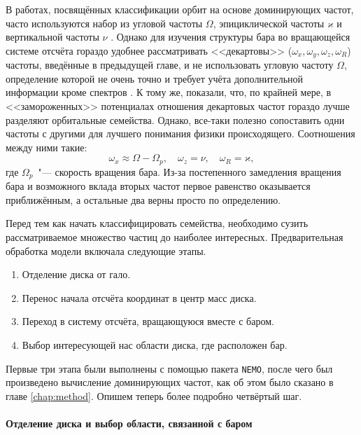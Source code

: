 \documentclass[tikz]{trlnotes}
\begin{document}
В работах, посвящённых классификации орбит на основе доминирующих частот, часто используются набор из угловой
частоты $Ω$, эпициклической частоты $ϰ$ и вертикальной частоты $ν$
\citep{athanassoula2002a,ceverino2007,voglis2007}. Однако для изучения структуры бара во вращающейся системе
отсчёта гораздо удобнее рассматривать <<декартовы>> ($ω_x, ω_y, ω_z, ω_R$) частоты, введённые в предыдущей главе, и не использовать угловую частоту $Ω$, определение которой не очень точно и требует учёта дополнительной информации кроме спектров
\citep{athanassoula2002,gajda2016}. К тому же, \citet{valluri2016} показали, что, по крайней мере, в <<замороженных>> потенциалах отношения декартовых частот
гораздо лучше разделяют орбитальные семейства. 
Однако, все-таки полезно сопоставить одни частоты с другими для лучшего понимания физики происходящего. Соотношения между ними такие: 
\[
  ω_x \approx Ω - Ω_p, \quad ω_z = ν, \quad ω_R = ϰ,
\]
где $Ω_p$~"--- скорость вращения бара. Из-за постепенного замедления вращения бара и возможного вклада вторых частот первое равенство оказывается приближённым, а остальные два верны просто по определению.

Перед тем как начать классифицировать семейства, необходимо сузить рассматриваемое множество частиц до наиболее
интересных. Предварительная обработка модели включала следующие этапы.
\begin{enumerate}
  \item Отделение диска от гало. 
  \item Перенос начала отсчёта координат в центр масс диска.
  \item Переход в систему отсчёта, вращающуюся вместе с баром.
  \item Выбор интересующей нас области диска, где расположен бар.
\end{enumerate}
Первые три этапа были выполнены с помощью пакета \texttt{NEMO}, после чего был произведено вычисление доминирующих частот, как об этом было сказано в главе \ref{chap:method}. Опишем теперь более 
подробно четвёртый шаг.
\paragraph{Отделение диска и выбор области, связанной с баром}
\end{document}
